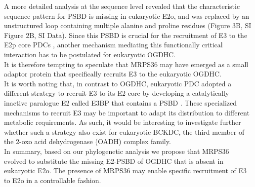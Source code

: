 \documentclass[times, twoside]{zHenriquesLab-StyleBioRxiv}
\begin{document}
A more detailed analysis at the sequence level revealed that the characteristic sequence pattern for PSBD is missing in eukaryotic E2o, and was replaced by an unstructured loop containing multiple alanine and proline residues (Figure 3B, SI Figure 2B, SI Data). Since this PSBD is crucial for the recruitment of E3 to the E2p core PDCs \cite{Allen_2005, Chandrasekhar_2013, Ciszak_2006, Mande_1996}, another mechanism mediating this functionally critical interaction has to be postulated for eukaryotic OGDHC.\\
It is therefore tempting to speculate that MRPS36 may have emerged as a small adaptor protein that specifically recruits E3 to the eukaryotic OGDHC.\\
It is worth noting that, in contrast to OGDHC, eukaryotic PDC adopted a different strategy to recruit E3 to its E2 core by developing a catalytically inactive paralogue E2 called E3BP that contains a PSBD \cite{Behal_1994, Smolle_2006}. These specialized mechanisms to recruit E3 may be important to adapt its distribution to different metabolic requirements. As such, it would be interesting to investigate further whether such a strategy also exist for eukaryotic BCKDC, the third member of the 2-oxo acid dehydrogenase (OADH) complex family.\\
In summary, based on our phylogenetic analysis we propose that MRPS36 evolved to substitute the missing E2-PSBD of OGDHC that is absent in eukaryotic E2o. The presence of MRPS36 may enable specific recruitment of E3 to E2o in a controllable fashion.
\end{document}
